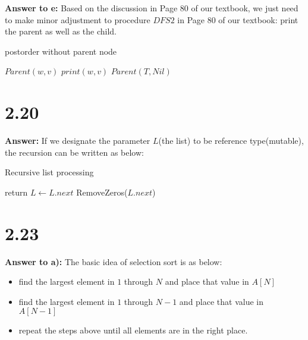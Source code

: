 \documentclass[a4paper,11pt]{article}
\theoremstyle{mytheor}
\begin{document}
\vspace{1.2in}

\noindent\textbf{Answer to e:} Based on the discussion in Page 80 of our textbook, we just need to make minor adjustment to procedure $DFS2$ in Page 80 of our textbook: print the parent as well as the child.
\begin{algorithm}[H]
\caption{postorder without parent node}\label{sec:TREEEVALUATION_2_19_E}
\begin{algorithmic}[1]
    \State $Parent(w, v)$
    \State $print(w, v)$
  \EndFor
\EndProcedure
\State
{}
  \State $Parent(T, Nil)$
\EndProcedure
\end{algorithmic}
\end{algorithm}

\vspace{1.2in}


\section*{2.20}
\noindent\textbf{Answer:} If we designate the parameter $L$(the list) to be reference type(mutable), the recursion can be written as below:

\begin{algorithm}[H]
\caption{Recursive list processing}\label{sec:TREEEVALUATION_2_20}
\begin{algorithmic}[1]
    \State return
    \State $L \gets L.next$ 
  \EndIf
    \State RemoveZeros($L.next$)
  \EndIf
\EndProcedure
\end{algorithmic}
\end{algorithm}

\vspace{1.2in}

\section*{2.23}
\noindent\textbf{Answer to a):} The basic idea of selection sort is as below:
\begin{itemize}
    \item find the largest element in $1$ through $N$ and place that value in $A[N]$
    \item find the largest element in $1$ through $N-1$ and place that value in $A[N-1]$
    \item repeat the steps above until all elements are in the right place.
\end{itemize}
\end{document}
